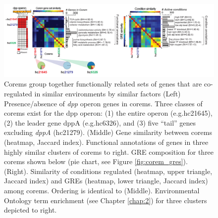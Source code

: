 \begin{figure}[h!]
    \centering
    \includegraphics[width=\textwidth]{figures/dpp_heatmaps}
 	\caption[Alternate regulatory modes for \textit{dpp} operon predicted by corems, \halo]{Corems group together functionally related sets of genes that are co-regulated in similar environments by similar factors (Left) Presence/absence of \textit{dpp} operon genes in corems. Three classes of corems exist for the dpp operon: (1) the entire operon (e.g.hc21645), (2) the leader gene dppA (e.g.hc6326), and (3) five ``tail'' genes excluding \textit{dppA} (hc21279). (Middle) Gene similarity between corems (heatmap, Jaccard index). Functional annotations of genes in three highly similar clusters of corems to right. GRE composition for three corems shown below (pie chart, see Figure \ref{fig:corem_gres}). (Right). Similarity of conditions regulated (heatmap, upper triangle, Jaccard index) and GREs (heatmap, lower triangle, Jaccard index) among corems. Ordering is identical to (Middle). Environmental Ontology term enrichment (see Chapter \ref{chap:2}) for three clusters depicted to right.
}
    \label{fig:dpp_heatmaps}
\end{figure}

